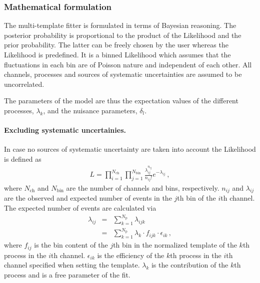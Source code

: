 \documentclass[11pt, a4paper]{article}
\begin{document}
\subsubsection{Mathematical formulation}
\label{section:math}

The multi-template fitter is formulated in terms of Bayesian reasoning. The
posterior probability is proportional to the product of the Likelihood
and the prior probability. The latter can be freely chosen by the user
whereas the Likelihood is predefined. It is a binned Likelihood which
assumes that the fluctuations in each bin are of Poisson nature and
independent of each other. All channels, processes and sources of
systematic uncertainties are assumed to be uncorrelated.

The parameters of the model are thus the expectation values of the
different processes, $\lambda_{k}$, and the nuisance parameters,
$\delta_{l}$.

\paragraph{Excluding systematic uncertainies.}
In case no sources of systematic uncertainty are taken into account
the Likelihood is defined as
%
\begin{eqnarray}
L = \prod_{i=1}^{N_{\mathrm{ch}}} \prod_{j=1}^{N_{\mathrm{bin}}} \frac{\lambda_{ij}^{n_{ij}}}{n_{ij}!} e^{-\lambda_{ij}} \, ,
\label{eqn:likelihood}
\end{eqnarray}
%
where $N_{\mathrm{ch}}$ and $N_{\mathrm{bin}}$ are the number of
channels and bins, respectively. $n_{ij}$ and $\lambda_{ij}$ are the
observed and expected number of events in the $j$th bin of the $i$th
channel. The expected number of events are calculated via
%
\begin{eqnarray}
\lambda_{ij} & = & \sum_{k=1}^{N_{\mathrm{p}}} \lambda_{ijk} \\
            & = & \sum_{k=1}^{N_{\mathrm{p}}} \lambda_{k} \cdot f_{ijk} \cdot \epsilon_{ik} \, ,
\label{eqn:expectation}
\end{eqnarray}
%
where $f_{ij}$ is the bin content of the $j$th bin in the normalized
template of the $k$th process in the $i$th channel. $\epsilon_{ik}$ is
the efficiency of the $k$th process in the $i$th channel specified
when setting the template. $\lambda_{k}$ is the contribution of the
$k$th process and is a free parameter of the fit.
\end{document}
